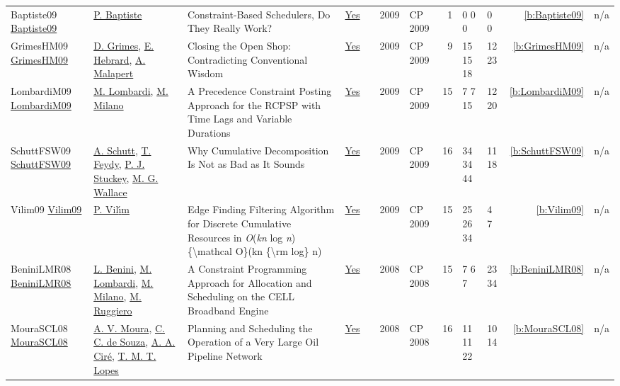 {\begin{longtable}{>{\raggedright\arraybackslash}p{3cm}>{\raggedright\arraybackslash}p{4.5cm}>{\raggedright\arraybackslash}p{6.0cm}rrrp{2.5cm}rp{1cm}p{1cm}rr}
Baptiste09 \href{https://doi.org/10.1007/978-3-642-04244-7_1}{Baptiste09} & \hyperref[auth:a162]{P. Baptiste} & Constraint-Based Schedulers, Do They Really Work? & \href{../works/Baptiste09.pdf}{Yes} & \cite{Baptiste09} & 2009 & CP 2009 & 1 & 0 0 0 & 0 0 & \ref{b:Baptiste09} & n/a\\
GrimesHM09 \href{https://doi.org/10.1007/978-3-642-04244-7_33}{GrimesHM09} & \hyperref[auth:a181]{D. Grimes}, \hyperref[auth:a1]{E. Hebrard}, \hyperref[auth:a82]{A. Malapert} & Closing the Open Shop: Contradicting Conventional Wisdom & \href{../works/GrimesHM09.pdf}{Yes} & \cite{GrimesHM09} & 2009 & CP 2009 & 9 & 15 15 18 & 12 23 & \ref{b:GrimesHM09} & n/a\\
LombardiM09 \href{https://doi.org/10.1007/978-3-642-04244-7_45}{LombardiM09} & \hyperref[auth:a142]{M. Lombardi}, \hyperref[auth:a143]{M. Milano} & A Precedence Constraint Posting Approach for the {RCPSP} with Time Lags and Variable Durations & \href{../works/LombardiM09.pdf}{Yes} & \cite{LombardiM09} & 2009 & CP 2009 & 15 & 7 7 15 & 12 20 & \ref{b:LombardiM09} & n/a\\
SchuttFSW09 \href{https://doi.org/10.1007/978-3-642-04244-7_58}{SchuttFSW09} & \hyperref[auth:a124]{A. Schutt}, \hyperref[auth:a154]{T. Feydy}, \hyperref[auth:a125]{P. J. Stuckey}, \hyperref[auth:a117]{M. G. Wallace} & Why Cumulative Decomposition Is Not as Bad as It Sounds & \href{../works/SchuttFSW09.pdf}{Yes} & \cite{SchuttFSW09} & 2009 & CP 2009 & 16 & 34 34 44 & 11 18 & \ref{b:SchuttFSW09} & n/a\\
Vilim09 \href{https://doi.org/10.1007/978-3-642-04244-7_62}{Vilim09} & \hyperref[auth:a121]{P. Vil{\'{\i}}m} & Edge Finding Filtering Algorithm for Discrete Cumulative Resources in \emph{O}(\emph{kn} log \emph{n})\{{\textbackslash}mathcal O\}(kn \{{\textbackslash}rm log\} n) & \href{../works/Vilim09.pdf}{Yes} & \cite{Vilim09} & 2009 & CP 2009 & 15 & 25 26 34 & 4 7 & \ref{b:Vilim09} & n/a\\
BeniniLMR08 \href{http://dx.doi.org/10.1007/978-3-540-85958-1_2}{BeniniLMR08} & \hyperref[auth:a245]{L. Benini}, \hyperref[auth:a142]{M. Lombardi}, \hyperref[auth:a143]{M. Milano}, \hyperref[auth:a718]{M. Ruggiero} & A Constraint Programming Approach for Allocation and Scheduling on the CELL Broadband Engine & \href{../works/BeniniLMR08.pdf}{Yes} & \cite{BeniniLMR08} & 2008 & CP 2008 & 15 & 7 6 7 & 23 34 & \ref{b:BeniniLMR08} & n/a\\
MouraSCL08 \href{https://doi.org/10.1007/978-3-540-85958-1_3}{MouraSCL08} & \hyperref[auth:a159]{A. V. Moura}, \hyperref[auth:a170]{C. C. de Souza}, \hyperref[auth:a157]{A. A. Cir{\'{e}}}, \hyperref[auth:a156]{T. M. T. Lopes} & Planning and Scheduling the Operation of a Very Large Oil Pipeline Network & \href{../works/MouraSCL08.pdf}{Yes} & \cite{MouraSCL08} & 2008 & CP 2008 & 16 & 11 11 22 & 10 14 & \ref{b:MouraSCL08} & n/a\\

\end{longtable}}
